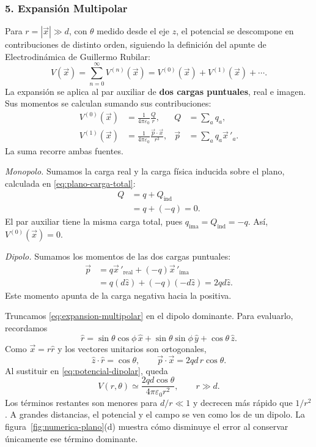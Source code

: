 \documentclass[11pt]{article}
\begin{document}
\subsubsection*{5. Expansión Multipolar}
Para $r=|\vec{x}|\gg d$, con $\theta$ medido desde el eje $z$, el
potencial se descompone en contribuciones de distinto orden, siguiendo
la definición del apunte de Electrodinámica de Guillermo Rubilar:
\begin{equation}
 V(\vec{x})=\sum_{n=0}^{\infty}V^{(n)}(\vec{x})
 =V^{(0)}(\vec{x})+V^{(1)}(\vec{x})+\cdots.
 \label{eq:expansion-multipolar}
\end{equation}
La expansión se aplica al par auxiliar de \textbf{dos cargas puntuales},
real e imagen. Sus momentos se calculan sumando sus contribuciones:
\begin{align}
 V^{(0)}(\vec{x})&=\frac{1}{4\pi\varepsilon_0}\frac{Q}{r},
 &Q&=\sum_a q_a,\label{eq:def-monopolo}\\
 V^{(1)}(\vec{x})&=\frac{1}{4\pi\varepsilon_0}
 \frac{\vec{p}\cdot\vec{x}}{r^3},
 &\vec{p}&=\sum_a q_a\vec{x}\,'_a.\label{eq:potencial-dipolar}
\end{align}
La suma recorre ambas fuentes.

\textit{Monopolo.} Sumamos la carga real y la carga física inducida
sobre el plano, calculada en \eqref{eq:plano-carga-total}:
\begin{align*}
 Q&=q+Q_{\mathrm{ind}}\\
  &=q+(-q)=0.
\end{align*}
El par auxiliar tiene la misma carga total, pues
$q_{\mathrm{ima}}=Q_{\mathrm{ind}}=-q$. Así, $V^{(0)}(\vec{x})=0$.

\textit{Dipolo.} Sumamos los momentos de las dos cargas puntuales:
\begin{equation}
 \begin{aligned}
 \vec{p}
 &=q\vec{x}\,'_{\mathrm{real}}+(-q)\vec{x}\,'_{\mathrm{ima}}\\
 &=q(d\hat{z})+(-q)(-d\hat{z})=2qd\hat{z}.
 \end{aligned}
 \label{eq:momento-dipolar}
\end{equation}
Este momento apunta de la carga negativa hacia la positiva.

Truncamos \eqref{eq:expansion-multipolar} en el dipolo dominante.
Para evaluarlo, recordamos
\[
 \hat{r}=\sin\theta\cos\phi\,\hat{x}
          +\sin\theta\sin\phi\,\hat{y}
          +\cos\theta\,\hat{z}.
\]
Como $\vec{x}=r\hat{r}$ y los vectores unitarios son ortogonales,
\[
 \hat{z}\cdot\hat{r}=\cos\theta,\qquad
 \vec{p}\cdot\vec{x}=2qd\,r\cos\theta.
\]
Al sustituir en \eqref{eq:potencial-dipolar}, queda
\begin{equation}
 \boxed{V(r,\theta)\simeq
 \frac{2qd\cos\theta}{4\pi\varepsilon_0r^2},\qquad r\gg d.}
 \label{eq:plano-dipolo}
\end{equation}
Los términos restantes son menores para $d/r\ll1$ y decrecen más rápido
que $1/r^2$. A grandes distancias, el potencial y el campo se ven como
los de un dipolo. La figura~\ref{fig:numerica-plano}(d) muestra cómo
disminuye el error al conservar únicamente ese término dominante.
\end{document}

